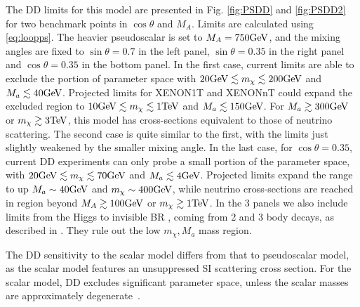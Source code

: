 The DD limits for this model are presented in Fig. \ref{fig:PSDD} and \ref{fig:PSDD2} for two benchmark points in $\cos\theta$ and $M_A$. Limits are calculated using \ref{eq:loopps}. The heavier pseudoscalar is set to $M_A=750\textrm{GeV}$, and the mixing angles are fixed to $\sin\theta=0.7$ in the left panel, $\sin\theta=0.35$ in the right panel and $\cos\theta=0.35$ in the bottom panel. 
In the first case, current limits are able to exclude the portion of parameter space with $20\textrm{GeV} \lesssim m_\chi \lesssim 200\textrm{GeV}$ and $M_a \lesssim 40\textrm{GeV}$. 
Projected limits for XENON1T and XENONnT could expand the excluded region to $10\textrm{GeV} \lesssim m_\chi \lesssim 1\textrm{TeV}$ and $M_a \lesssim 150\textrm{GeV}$. 
For $M_a\gtrsim 300\textrm{GeV}$ or $m_\chi \gtrsim 3\textrm{TeV}$, this model has cross-sections equivalent to those of neutrino scattering. 
The second case is quite similar to the first, with the limits just slightly weakened by the smaller mixing angle. 
In the last case, for $\cos\theta=0.35$, current DD experiments can only probe a small portion of the parameter space, with $20\textrm{GeV} \lesssim m_\chi \lesssim 70\textrm{GeV}$ and $M_a \lesssim 4\textrm{GeV}$. 
Projected limits expand the range to up $M_a\sim 40\textrm{GeV}$ and $m_\chi\sim 400\textrm{GeV}$, while neutrino cross-sections are reached in region beyond $M_A\gtrsim 100\textrm{GeV}$ or $m_\chi \gtrsim 1\textrm{TeV}$. 
In the 3 panels we also include limits from the Higgs to invisible BR \citep{Aad:2015pla,Khachatryan:2016whc}, coming from 2 and 3 body decays, as described in \citep{Bauer:2017ota}. 
They rule out the low $m_\chi,M_a$ mass region. 

The DD sensitivity to the scalar model differs from that to pseudoscalar model, as the scalar model features an unsuppressed SI scattering cross section. For the scalar model, DD excludes significant parameter space, unless the scalar masses are approximately degenerate~\cite{Bell:2017rgi}. 

